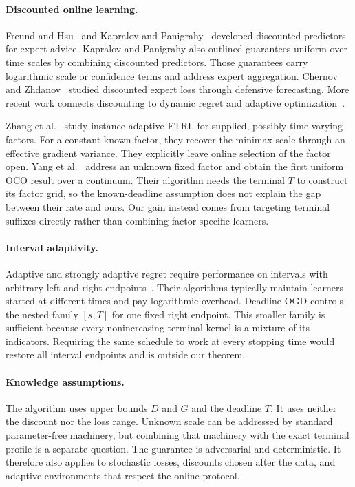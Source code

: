 \documentclass{article}
\begin{document}
\paragraph{Discounted online learning.} Freund and Hsu~\citep{freund2008hedging} and Kapralov and Panigrahy~\citep{kapralov2011prediction} developed discounted predictors for expert advice. Kapralov and Panigrahy also outlined guarantees uniform over time scales by combining discounted predictors. Those guarantees carry logarithmic scale or confidence terms and address expert aggregation. Chernov and Zhdanov~\citep{chernov2010prediction} studied discounted expert loss through defensive forecasting. More recent work connects discounting to dynamic regret and adaptive optimization~\citep{jacobsen2024online,ahn2024understanding,xie2026dynamic}.

Zhang et al.~\citep{zhang2024discounted} study instance-adaptive FTRL for supplied, possibly time-varying factors. For a constant known factor, they recover the minimax scale through an effective gradient variance. They explicitly leave online selection of the factor open. Yang et al.~\citep{yang2026uniform} address an unknown fixed factor and obtain the first uniform OCO result over a continuum. Their algorithm needs the terminal $T$ to construct its factor grid, so the known-deadline assumption does not explain the gap between their rate and ours. Our gain instead comes from targeting terminal suffixes directly rather than combining factor-specific learners.

\paragraph{Interval adaptivity.} Adaptive and strongly adaptive regret require performance on intervals with arbitrary left and right endpoints~\citep{daniely2015strongly,cutkosky2020parameter}. Their algorithms typically maintain learners started at different times and pay logarithmic overhead. Deadline OGD controls the nested family $[s,T]$ for one fixed right endpoint. This smaller family is sufficient because every nonincreasing terminal kernel is a mixture of its indicators. Requiring the same schedule to work at every stopping time would restore all interval endpoints and is outside our theorem.

\paragraph{Knowledge assumptions.} The algorithm uses upper bounds $D$ and $G$ and the deadline $T$. It uses neither the discount nor the loss range. Unknown scale can be addressed by standard parameter-free machinery, but combining that machinery with the exact terminal profile is a separate question. The guarantee is adversarial and deterministic. It therefore also applies to stochastic losses, discounts chosen after the data, and adaptive environments that respect the online protocol.
\end{document}
